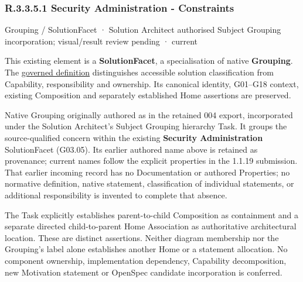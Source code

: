 \subsubsection*{R.3.3.5.1 Security Administration - Constraints}
\label{navigation:R.3.3.5.1}

\label{element:f9035f49dbab4676b23ab9e4f45678f9}
{\small Grouping / SolutionFacet · Solution Architect authorised Subject Grouping incorporation; visual/result review pending · current}\par

This existing element is a \textbf{SolutionFacet}, a specialisation of native
\textbf{Grouping}. The \href{\detokenize{../../../../../../../governance/continuum-representation.md#solutionfacet-classification--1119-candidate}}{governed definition}
distinguishes accessible solution classification from Capability, responsibility
and ownership. Its canonical identity, G01–G18 context, existing Composition
and separately established Home assertions are preserved.



Native Grouping originally authored as \texttt{} in the retained 004 export,
incorporated under the Solution Architect's Subject Grouping hierarchy Task.
It groups the source-qualified \texttt{} concern within
the existing \textbf{Security Administration} SolutionFacet (G03.05). Its earlier authored name above is retained as provenance; current names
follow the explicit properties in the 1.1.19 submission.
That earlier incoming record has no Documentation or authored Properties; no normative
definition, native statement, classification of individual statements, or
additional responsibility is invented to complete that absence.



The Task explicitly establishes parent-to-child Composition as containment and
a separate directed child-to-parent Home Association as authoritative architectural
location. These are distinct assertions. Neither diagram membership nor the
Grouping's label alone establishes another Home or a statement allocation.
No component ownership, implementation dependency, Capability decomposition,
new Motivation statement or OpenSpec candidate incorporation is conferred.



